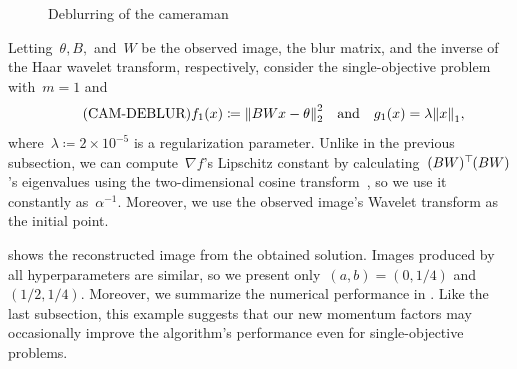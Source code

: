 \documentclass[../main]{subfiles}
\begin{document}
\begin{figure}[htpb]
\begin{minipage}[b]{.45\hsize}
    \end{minipage}
    \caption{Deblurring of the cameraman}
\end{figure}

Letting~$\theta, B,$ and~$W$ be the observed image, the blur matrix, and the inverse of the Haar wavelet transform, respectively, consider the single-objective problem~ with~$m = 1$ and
\begin{equation} \label{eq:cam_deblur} \tag{CAM-DEBLUR}
    f_1(x) \coloneqq \norm*{BWx - \theta}_2^2 \eqand g_1(x)=\lambda \norm*{x}_1
    ,\end{equation}
where~$\lambda \coloneqq 2 \times 10^{-5}$ is a regularization parameter.
Unlike in the previous subsection, we can compute~$\nabla f$'s Lipschitz constant by calculating~$(BW)^\top\hspace{-1pt}(BW)$'s eigenvalues using the two-dimensional cosine transform~\cite{Hansen2006}, so we use it constantly as~$\alpha^{-1}$.
Moreover, we use the observed image's Wavelet transform as the initial point.

 shows the reconstructed image from the obtained solution.
Images produced by all hyperparameters are similar, so we present only~$(a, b) = (0, 1 / 4)$ and~$(1 / 2, 1 / 4)$.
Moreover, we summarize the numerical performance in .
Like the last subsection, this example suggests that our new momentum factors may occasionally improve the algorithm's performance even for single-objective problems.
\end{document}
